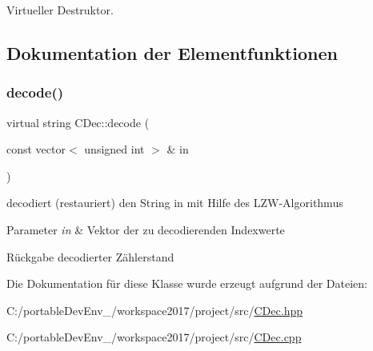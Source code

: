 Virtueller Destruktor. 



\subsection{Dokumentation der Elementfunktionen}
\mbox{\label{class_c_dec_a88c60d9d4285714347a3bae0ef0a319d}} 
\subsubsection{\texorpdfstring{decode()}{decode()}}
{\footnotesize\ttfamily virtual string C\+Dec\+::decode (\begin{DoxyParamCaption}\item[{const vector$<$ unsigned int $>$ \&}]{in }\end{DoxyParamCaption})\hspace{0.3cm}{\ttfamily [pure virtual]}}

decodiert (restauriert) den String in mit Hilfe des L\+Z\+W-\/\+Algorithmus 
\begin{DoxyParams}{Parameter}
{\em in} & Vektor der zu decodierenden Indexwerte \\
\hline
\end{DoxyParams}
\begin{DoxyReturn}{Rückgabe}
decodierter Zählerstand 
\end{DoxyReturn}


Die Dokumentation für diese Klasse wurde erzeugt aufgrund der Dateien\+:\begin{DoxyCompactItemize}
\item 
C\+:/portable\+Dev\+Env\+\_/workspace2017/project/src/\hyperlink{_c_dec_8hpp}{C\+Dec.\+hpp}\item 
C\+:/portable\+Dev\+Env\+\_/workspace2017/project/src/\hyperlink{_c_dec_8cpp}{C\+Dec.\+cpp}\end{DoxyCompactItemize}
